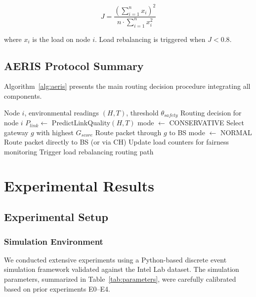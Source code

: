\documentclass[sensors,article,submit,moreauthors,pdftex]{Definitions/mdpi}
\begin{document}
\begin{equation}
J = \frac{\left(\sum_{i=1}^{n} x_i\right)^2}{n \cdot \sum_{i=1}^{n} x_i^2}
\end{equation}

where $x_i$ is the load on node $i$. Load rebalancing is triggered when $J < 0.8$.

\subsection{AERIS Protocol Summary}

Algorithm~\ref{alg:aeris} presents the main routing decision procedure integrating all components.

\begin{algorithm}[H]
\caption{AERIS Routing Decision}
\label{alg:aeris}
\begin{algorithmic}[1]
\REQUIRE Node $i$, environmental readings $(H, T)$, threshold $\theta_{safety}$
\ENSURE Routing decision for node $i$
\STATE $P_{link} \leftarrow$ PredictLinkQuality$(H, T)$ 
    \STATE mode $\leftarrow$ CONSERVATIVE
    \STATE Select gateway $g$ with highest $G_{score}$
    \STATE Route packet through $g$ to BS
\ELSE
    \STATE mode $\leftarrow$ NORMAL
    \STATE Route packet directly to BS (or via CH)
\ENDIF
\STATE Update load counters for fairness monitoring
    \STATE Trigger load rebalancing
\ENDIF
\RETURN routing path
\end{algorithmic}
\end{algorithm}

\section{Experimental Results}\label{sec:results}

\subsection{Experimental Setup}

\subsubsection{Simulation Environment}

We conducted extensive experiments using a Python-based discrete event simulation framework validated against the Intel Lab dataset. The simulation parameters, summarized in Table~\ref{tab:parameters}, were carefully calibrated based on prior experiments E0--E4.
\end{document}
